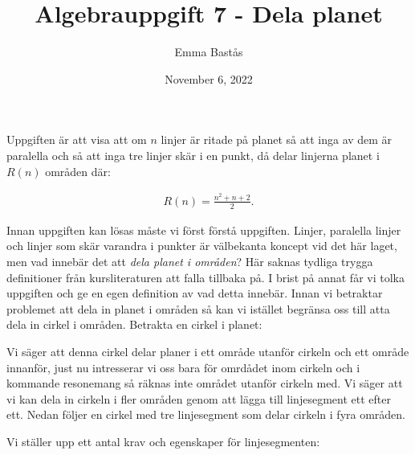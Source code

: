 \documentclass{article}
\title{Algebrauppgift 7 - Dela planet}
\author{Emma Bastås}
\date{November 6, 2022}
\begin{document}
\maketitle

Uppgiften är att visa att om $n$ linjer är ritade på planet så att inga av dem är paralella och så att inga tre linjer skär i en punkt, då delar linjerna planet i $R(n)$ områden där:

\begin{gather*}
  R(n) = \frac{n^{2} + n + 2}{2}\text{.}
\end{gather*}

Innan uppgiften kan lösas måste vi först förstå uppgiften. Linjer, paralella linjer och linjer som skär varandra i punkter är välbekanta koncept vid det här laget, men vad innebär det att \emph{dela planet i områden}? Här saknas tydliga trygga definitioner från kursliteraturen att falla tillbaka på. I brist på annat får vi tolka uppgiften och ge en egen definition av vad detta innebär. Innan vi betraktar problemet att dela in planet i områden så kan vi istället begränsa oss till atta dela in cirkel i områden. Betrakta en cirkel i planet:

\begin{center}
\end{center}

Vi säger att denna cirkel delar planer i ett område utanför cirkeln och ett område innanför, just nu intresserar vi oss bara för omrdådet inom cirkeln och i kommande resonemang så räknas inte området utanför cirkeln med. Vi säger att vi kan dela in cirkeln i fler områden genom att lägga till linjesegment ett efter ett. Nedan följer en cirkel med tre linjesegment som delar cirkeln i fyra områden.

\begin{center}
\end{center}

Vi ställer upp ett antal krav och egenskaper för linjesegmenten:
\end{document}
